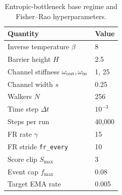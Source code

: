\begin{table}[t]
\centering
\small
\caption{Entropic-bottleneck base regime and Fisher--Rao hyperparameters.}
\label{tab:eb_design}
\begin{tabular}{ll}
\toprule
Quantity & Value \\
\midrule
Inverse temperature $\beta$ & 8 \\
Barrier height $H$ & 2.5 \\
Channel stiffness $\omega_{\rm out},\omega_{\rm in}$ & 1, 25 \\
Channel width $s$ & 0.25 \\
Walkers $N$ & 256 \\
Time step $\Delta t$ & $10^{-3}$ \\
Steps per run & 40{,}000 \\
FR rate $\gamma$ & 15 \\
FR stride \texttt{fr\_every} & 10 \\
Score clip $S_{\max}$ & 3 \\
Event cap $f_{\max}$ & 0.08 \\
Target EMA rate & 0.005 \\
\bottomrule
\end{tabular}
\end{table}
